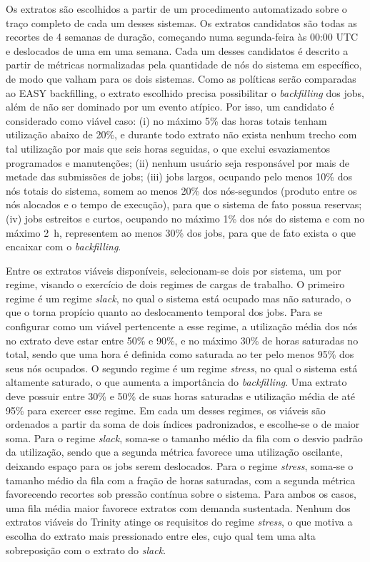 Os extratos são escolhidos a partir de um procedimento automatizado sobre o traço completo de cada um desses sistemas.
Os extratos candidatos são todas as recortes de 4 semanas de duração, começando numa segunda-feira às 00:00 UTC e deslocados
de uma em uma semana. Cada um desses candidatos é descrito a partir de métricas normalizadas pela quantidade de nós do sistema
em específico, de modo que valham para os dois sistemas. Como as políticas serão comparadas ao EASY backfilling,
o extrato escolhido precisa possibilitar o \textit{backfilling} dos jobs, além de não ser dominado por um 
evento atípico. Por isso, um candidato é considerado como viável caso: (i) no máximo 5\% das horas totais tenham 
utilização abaixo de 20\%, e durante todo extrato não exista nenhum trecho com tal utilização por mais que seis horas seguidas,
o que exclui esvaziamentos programados e manutenções; (ii) nenhum usuário seja responsável por mais de metade das submissões de jobs; (iii) 
jobs largos, ocupando pelo menos 10\% dos nós totais do sistema, somem ao menos 20\% dos nós-segundos (produto entre os nós alocados
e o tempo de execução), para que o sistema de fato possua reservas; (iv) jobs estreitos e curtos, ocupando no máximo 1\% dos
nós do sistema e com no máximo 2~h, representem ao menos 30\% dos jobs, para que de fato exista o que encaixar com o \textit{backfilling}.

Entre os extratos viáveis disponíveis, selecionam-se dois por sistema, um por regime, visando o exercício de dois regimes de cargas de trabalho. 
O primeiro regime é um regime \textit{slack}, no qual o sistema está ocupado mas não saturado, o que o torna propício
quanto ao deslocamento temporal dos jobs. Para se configurar como um viável pertencente a esse regime, a utilização média dos 
nós no extrato deve estar entre 50\% e 90\%, e no máximo 30\% de horas saturadas no total, sendo que uma
hora é definida como saturada ao ter pelo menos 95\% dos seus nós ocupados. O segundo regime é um regime \textit{stress}, no qual o sistema
está altamente saturado, o que aumenta a importância do \textit{backfilling}. Uma extrato deve possuir entre 30\% e 50\% de 
suas horas saturadas e utilização média de até 95\% para exercer esse regime. Em cada um desses regimes, os viáveis são ordenados a partir da soma de 
dois índices padronizados, e escolhe-se o de maior soma. Para o regime
\textit{slack}, soma-se o tamanho médio da fila com o desvio padrão da utilização, sendo que a segunda métrica favorece 
uma utilização oscilante, deixando espaço para os jobs serem deslocados. Para o regime \textit{stress}, soma-se o tamanho médio da fila
com a fração de horas saturadas, com a segunda métrica favorecendo recortes sob pressão contínua sobre o sistema. 
Para ambos os casos, uma fila média maior favorece extratos com demanda sustentada. Nenhum dos extratos viáveis do Trinity
atinge os requisitos do regime \textit{stress}, o que motiva a escolha do extrato mais pressionado entre eles, cujo qual tem uma
alta sobreposição com o extrato do \textit{slack}.

